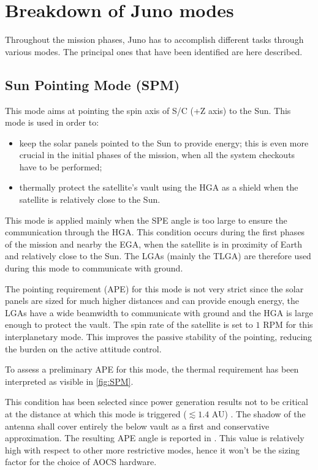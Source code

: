 \section{Breakdown of Juno modes}
\label{sec:AOCS_modes}

Throughout the mission phases, Juno has to accomplish different tasks through various modes. The principal ones that have been identified are here described.

\subsection{Sun Pointing Mode (SPM)}
\label{subsec:sun_pointing_mode}

This mode aims at pointing the spin axis of S/C (+Z axis) to the Sun. This mode is used in order to:
\begin{itemize}
    \item keep the solar panels pointed to the Sun to provide energy; this is even more crucial in the initial phases of the mission, when all the system checkouts have to be performed;
    \item thermally protect the satellite's vault using the HGA as a shield when the satellite is relatively close to the Sun.
\end{itemize}

This mode is applied mainly when the SPE angle is too large to ensure the communication through the HGA. This condition occurs during the first phases of the mission and nearby the EGA, when the satellite is in proximity of Earth and relatively close to the Sun. The LGAs (mainly the TLGA) are therefore used during this mode to communicate with ground.

The pointing requirement (APE) for this mode is not very strict since the solar panels are sized for much higher distances and can provide enough energy, the LGAs have a wide beamwidth to communicate with ground and the HGA is large enough to protect the vault.
The spin rate of the satellite is set to $1$ RPM for this interplanetary mode. This improves the passive stability of the pointing, reducing the burden on the active attitude control.

To assess a preliminary APE for this mode, the thermal requirement has been interpreted as visible in \autoref{fig:SPM}.

This condition has been selected since power generation results not to be critical at the distance at which this mode is triggered ($\lesssim 1.4$ AU) \cite{kurth}.
The shadow of the antenna shall cover entirely the below vault as a first and conservative approximation.
The resulting APE angle is reported in \mref.
This value is relatively high with respect to other more restrictive modes, hence it won't be the sizing factor for the choice of AOCS hardware.

